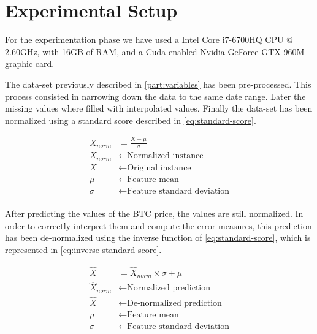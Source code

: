 
\chapter{Experimental Setup}
\label{ch:experimental-setup}

For the experimentation phase we have used a Intel Core i7-6700HQ CPU
@ 2.60GHz, with 16GB of RAM, and a Cuda enabled Nvidia GeForce GTX
960M graphic card.

The data-set previously described in \autoref{part:variables} has been
pre-processed. This process consisted in narrowing down the data to
the same date range. Later the missing values where filled with
interpolated values. Finally the data-set has been normalized using a
standard score described in \autoref{eq:standard-score}.

\begin{equation}
  \begin{aligned}
    \label{eq:standard-score} X_{norm} & = \frac{X-\mu}{\sigma} \\
X_{norm} & \leftarrow \text{Normalized instance} \\ X & \leftarrow
\text{Original instance} \\ \mu & \leftarrow \text{Feature mean} \\
\sigma & \leftarrow \text{Feature standard deviation} \\
  \end{aligned}
\end{equation}

After predicting the values of the BTC price, the values are still
normalized. In order to correctly interpret them and compute the error
measures, this prediction has been de-normalized using the inverse
function of \autoref{eq:standard-score}, which is represented in
\autoref{eq:inverse-standard-score}.

\begin{equation}
  \begin{aligned}
    \label{eq:inverse-standard-score} \hat{X} & = \hat{X}_{norm}
\times \sigma + \mu \\ \hat{X}_{norm} & \leftarrow \text{Normalized
prediction} \\ \hat{X} & \leftarrow \text{De-normalized prediction} \\
\mu & \leftarrow \text{Feature mean} \\ \sigma & \leftarrow
\text{Feature standard deviation} \\
  \end{aligned}
\end{equation}


